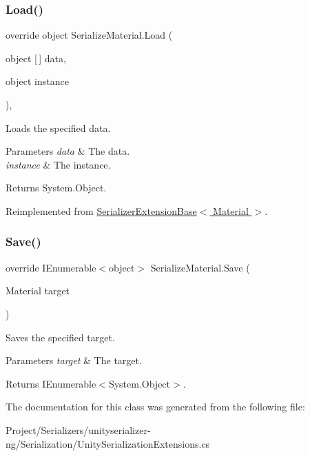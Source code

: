 \subsubsection{\texorpdfstring{Load()}{Load()}}
{\footnotesize\ttfamily override object Serialize\+Material.\+Load (\begin{DoxyParamCaption}\item[{object \mbox{[}$\,$\mbox{]}}]{data,  }\item[{object}]{instance }\end{DoxyParamCaption})\hspace{0.3cm}{\ttfamily [inline]}, {\ttfamily [virtual]}}



Loads the specified data. 


\begin{DoxyParams}{Parameters}
{\em data} & The data.\\
\hline
{\em instance} & The instance.\\
\hline
\end{DoxyParams}
\begin{DoxyReturn}{Returns}
System.\+Object.
\end{DoxyReturn}


Reimplemented from \hyperlink{class_serializer_extension_base_a3792a9b27056e30ca0ac91531936ae47}{Serializer\+Extension\+Base$<$ Material $>$}.

\mbox{\label{class_serialize_material_a9478a00c7ed2237f8fd8db4f190bd96c}} 
\subsubsection{\texorpdfstring{Save()}{Save()}}
{\footnotesize\ttfamily override I\+Enumerable$<$object$>$ Serialize\+Material.\+Save (\begin{DoxyParamCaption}\item[{Material}]{target }\end{DoxyParamCaption})\hspace{0.3cm}{\ttfamily [inline]}}



Saves the specified target. 


\begin{DoxyParams}{Parameters}
{\em target} & The target.\\
\hline
\end{DoxyParams}
\begin{DoxyReturn}{Returns}
I\+Enumerable$<$System.\+Object$>$.
\end{DoxyReturn}


The documentation for this class was generated from the following file\+:\begin{DoxyCompactItemize}
\item 
Project/\+Serializers/unityserializer-\/ng/\+Serialization/Unity\+Serialization\+Extensions.\+cs\end{DoxyCompactItemize}
